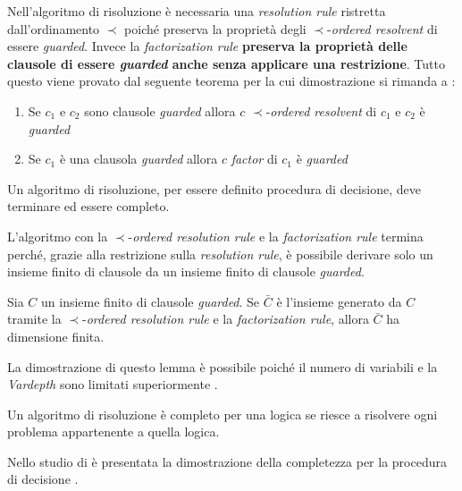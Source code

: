 Nell'algoritmo di risoluzione è necessaria una \emph{resolution rule} ristretta dall'ordinamento $\prec$ poiché preserva 
la proprietà degli $\prec$-\emph{ordered resolvent} di essere \emph{guarded}. Invece la \emph{factorization rule}
\textbf{preserva la proprietà delle clausole di essere \emph{guarded} anche senza applicare una restrizione}.
Tutto questo viene provato dal seguente teorema per la cui dimostrazione si rimanda a \cite{de2003deciding}:
\begin{theorem}
    \begin{enumerate}
        \item Se $c_1$ e $c_2$ sono clausole \emph{guarded} allora $c$ $\prec$-\emph{ordered resolvent} di $c_1$ e $c_2$ è
        \emph{guarded}
        \item Se $c_1$ è una clausola \emph{guarded} allora $c$ \emph{factor} di $c_1$ è \emph{guarded}
    \end{enumerate}
\end{theorem}
Un algoritmo di risoluzione, per essere definito procedura di decisione, deve terminare ed essere completo.

L'algoritmo con la $\prec$-\emph{ordered resolution rule} e la \emph{factorization rule} termina perché, grazie alla restrizione
sulla \emph{resolution rule}, è possibile derivare solo un insieme finito di clausole da un insieme finito di clausole \emph{guarded}. 
\begin{lemma}
    Sia $C$ un insieme finito di clausole \emph{guarded}. Se $\bar{C}$ è l'insieme generato da $C$ tramite 
    la $\prec$-\emph{ordered resolution rule} e la \emph{factorization rule}, allora $\bar{C}$ ha dimensione finita.
\end{lemma}
La dimostrazione di questo lemma è possibile poiché il numero di variabili e la \emph{Vardepth} sono limitati superiormente \cite{de2003deciding}. 

\begin{definition}
    Un algoritmo di risoluzione è completo per una logica se riesce a risolvere ogni problema appartenente
    a quella logica. 
\end{definition}
Nello studio di \citeauthor{de2003deciding} è presentata la dimostrazione della completezza per la procedura di decisione \cite{de2003deciding}.